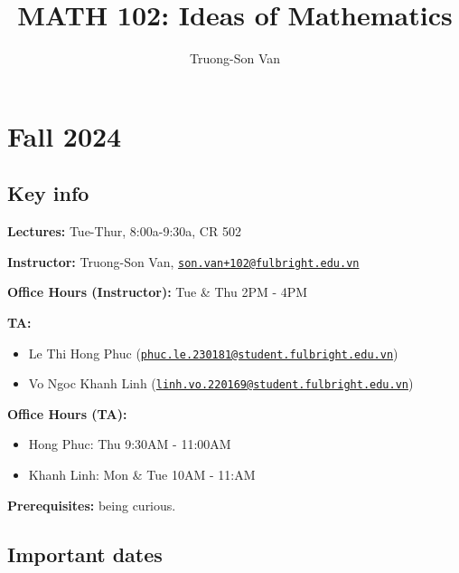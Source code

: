 \documentclass[
]{article}
\title{MATH 102: Ideas of Mathematics}
\author{Truong-Son Van}
\date{}
\begin{document}
\maketitle

{
\setcounter{tocdepth}{2}
\tableofcontents
}
\section*{Fall 2024}\label{fall-2024}

\subsection*{Key info}\label{key-info}

\textbf{Lectures:} Tue-Thur, 8:00a-9:30a, CR 502

\textbf{Instructor:} Truong-Son Van, \href{mailto:son.van+102@fulbright.edu.vn}{\nolinkurl{son.van+102@fulbright.edu.vn}}

\textbf{Office Hours (Instructor):} Tue \& Thu 2PM - 4PM

\textbf{TA:}

\begin{itemize}
\item
  Le Thi Hong Phuc (\href{mailto:phuc.le.230181@student.fulbright.edu.vn}{\nolinkurl{phuc.le.230181@student.fulbright.edu.vn}})
\item
  Vo Ngoc Khanh Linh (\href{mailto:linh.vo.220169@student.fulbright.edu.vn}{\nolinkurl{linh.vo.220169@student.fulbright.edu.vn}})
\end{itemize}

\textbf{Office Hours (TA):}

\begin{itemize}
\item
  Hong Phuc: Thu 9:30AM - 11:00AM
\item
  Khanh Linh: Mon \& Tue 10AM - 11:AM
\end{itemize}

\textbf{Prerequisites:} being curious.

\subsection*{Important dates}\label{important-dates}
\end{document}
